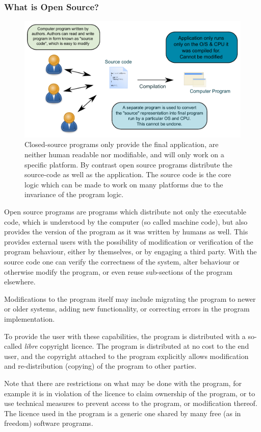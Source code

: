 \documentclass[10pt]{article}
\begin{document}
\subsubsection{What is Open Source?}
\begin{figure}
 \includegraphics[width=0.7 \textwidth,keepaspectratio=true]{./figures/compilation.pdf}
 \caption{Closed-source programs only provide the final application, are neither human readable nor modifiable, and will only work on a specific platform. By contrast open source programs distribute the source-code as well as the application. The source code is the core logic which can be made to work on many platforms due to the invariance of the program logic.}
\label{fig:compilation}
\end{figure}
Open source programs are programs which distribute not only the executable code, which is understood by the computer (so called machine code), but also provides the version of the program as it was written by humans as well. This provides external users with the possibility of modification or verification of the program behaviour, either by themselves, or by engaging a third party. With the source code one can verify the correctness of the system, alter behaviour or otherwise modify the program, or even reuse sub-sections of the program elsewhere. 

Modifications to the program itself may include migrating the program to newer or older systems, adding new functionality, or correcting errors in the program implementation.  
 
To provide the user with these capabilities, the program is distributed with a so-called \textit{libre} copyright licence. The program is distributed at no cost to the end user, and the copyright attached to the program explicitly allows modification and re-distribution (copying) of the program to other parties.

Note that there are restrictions on what may be done with the program, for example it is in violation of the licence to claim ownership of the program, or to use technical measures to prevent access to the program, or modification thereof. The licence used in the program is a generic one shared by many free (as in freedom) software programs. 
\end{document}
